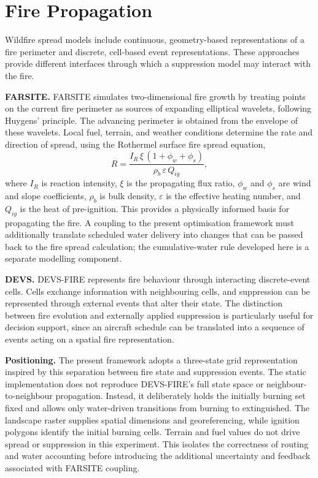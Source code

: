 \section{Fire Propagation}
\label{sec:lit-fire-propagation}

Wildfire spread models include continuous, geometry-based representations of a fire perimeter and discrete, cell-based event representations. These approaches provide different interfaces through which a suppression model may interact with the fire.

\textbf{FARSITE.} FARSITE \cite{finney1998farsite} simulates two-dimensional fire growth by treating points on the current fire perimeter as sources of expanding elliptical wavelets, following Huygens' principle. The advancing perimeter is obtained from the envelope of these wavelets. Local fuel, terrain, and weather conditions determine the rate and direction of spread, using the Rothermel surface fire spread equation,
\begin{equation}
    R = \frac{I_R\,\xi\,(1+\phi_w+\phi_s)}{\rho_b\,\varepsilon\,Q_{ig}},
\end{equation}
where $I_R$ is reaction intensity, $\xi$ is the propagating flux ratio, $\phi_w$ and $\phi_s$ are wind and slope coefficients, $\rho_b$ is bulk density, $\varepsilon$ is the effective heating number, and $Q_{ig}$ is the heat of pre-ignition. This provides a physically informed basis for propagating the fire. A coupling to the present optimisation framework must additionally translate scheduled water delivery into changes that can be passed back to the fire spread calculation; the cumulative-water rule developed here is a separate modelling component.

\textbf{DEVS.} DEVS-FIRE \cite{hu2012devsfire} represents fire behaviour through interacting discrete-event cells. Cells exchange information with neighbouring cells, and suppression can be represented through external events that alter their state. The distinction between fire evolution and externally applied suppression is particularly useful for decision support, since an aircraft schedule can be translated into a sequence of events acting on a spatial fire representation.

\textbf{Positioning.} The present framework adopts a three-state grid representation inspired by this separation between fire state and suppression events. The static implementation does not reproduce DEVS-FIRE's full state space or neighbour-to-neighbour propagation. Instead, it deliberately holds the initially burning set fixed and allows only water-driven transitions from burning to extinguished. The landscape raster supplies spatial dimensions and georeferencing, while ignition polygons identify the initial burning cells. Terrain and fuel values do not drive spread or suppression in this experiment. This isolates the correctness of routing and water accounting before introducing the additional uncertainty and feedback associated with FARSITE coupling.

